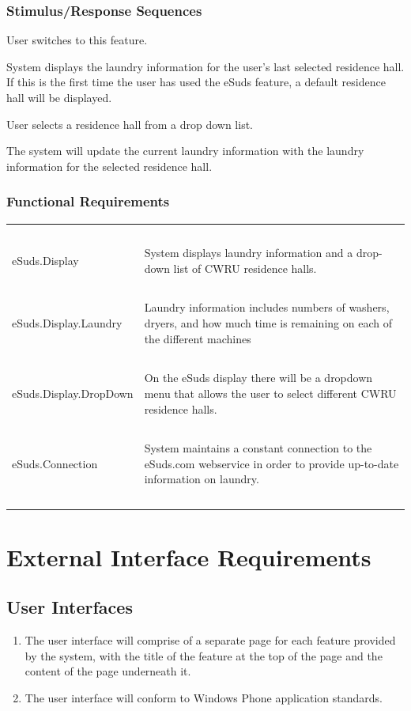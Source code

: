 \documentclass[pdftex,12pt,letter]{article}
\begin{document}
\subsubsection{Stimulus/Response Sequences}
\begin{description}\itemsep1pt
\item[Stimulus:] User switches to this feature.
\item[Response:] System displays the laundry information for the user's last selected residence hall. If this is the first time the user has used the eSuds feature, a default residence hall will be displayed.
\item[Stimulus:] User selects a residence hall from a drop down list.
\item[Response:] The system will update the current laundry information with the laundry information for the selected residence hall.
\end{description}
\subsubsection{Functional Requirements}
\begin{table}[!h]
\begin{tabularx}{\textwidth}[t]{|l Y|}
\hline
~&~\\
eSuds.Display & System displays laundry information and a drop-down list of CWRU residence halls.\\ 
~&~\\
eSuds.Display.Laundry & Laundry information includes numbers of washers, dryers, and how much time is remaining on each of the different machines \\
~&~\\
eSuds.Display.DropDown & On the eSuds display there will be a dropdown menu that allows the user to select different CWRU residence halls.\\
~&~\\
eSuds.Connection & System maintains a constant connection to the eSuds.com webservice in order to provide up-to-date information on laundry.\\
~&~\\
\hline
\end{tabularx}
\end{table}
\FloatBarrier
\section{External Interface Requirements}
\subsection{User Interfaces}
\begin{enumerate}[UI-1:]
\item The user interface will comprise of a separate page for each feature provided by the system, with the title of the feature at the top of the page and the content of the page underneath it.
\item The user interface will conform to Windows Phone application standards.
\end{enumerate}
\end{document}
